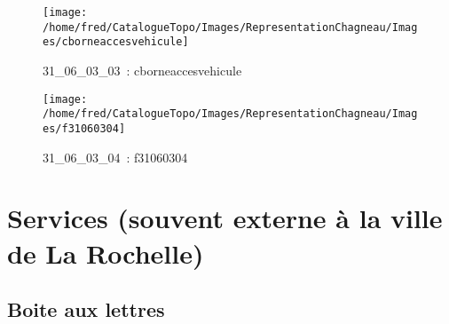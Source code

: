 \documentclass[12pt,titlepage]{book}
\begin{document}
\begin{figure}[h!]
  \begin{minipage}[t]{3cm}
    \begin{center}
      \texttt{[image: /home/fred/CatalogueTopo/Images/RepresentationChagneau/Images/cborneaccesvehicule]}
      \caption[~31\_06\_03\_03]{\small{31\_06\_03\_03~:} \tiny{cborneaccesvehicule}}\label{cborneaccesvehicule}
    \end{center}
  \end{minipage}
  \begin{minipage}[t]{3cm}
    \begin{center}
      \texttt{[image: /home/fred/CatalogueTopo/Images/RepresentationChagneau/Images/f31060304]}
      \caption[~31\_06\_03\_04]{\small{31\_06\_03\_04~:} \tiny{f31060304}}\label{f31060304}
    \end{center}
  \end{minipage}
\end{figure}

\section{\large Services (souvent externe à la ville de La Rochelle)}
\subsection{Boite aux lettres}
\noindent
\vspace{\baselineskip}
\end{document}
